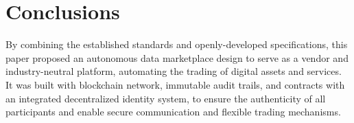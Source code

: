\documentclass[conference]{IEEEtran}
\begin{document}
\section{Conclusions}
By combining the established standards and openly-developed specifications, this paper proposed an autonomous data marketplace design to serve as a vendor and industry-neutral platform, automating the trading of digital assets and services. It was built with blockchain network, immutable audit trails, and contracts with an integrated decentralized identity system, to ensure the authenticity of all participants and enable secure communication and flexible trading mechanisms.




\end{document}

